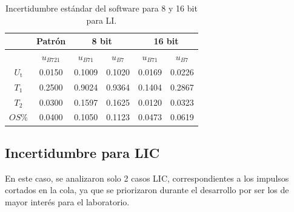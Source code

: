 \begin{table}[H]
    \centering
    \begin{tabular}{@{}cccccc@{}}
        \toprule
                              & \textbf{Patrón}     & \multicolumn{2}{c}{\textbf{8 bit}}     & \multicolumn{2}{c}{\textbf{16 bit}}    \\ \midrule
                              & \textbf{$u_{B721}$} & \textbf{$u_{B71}$} & \textbf{$u_{B7}$} & \textbf{$u_{B71}$} & \textbf{$u_{B7}$} \\ \midrule
        \textbf{$U_\text{t}$} & 0.0150              & 0.1009             & 0.1020            & 0.0169             & 0.0226            \\ \midrule
        \textbf{$T_1$}        & 0.2500              & 0.9024             & 0.9364            & 0.1404             & 0.2867            \\ \midrule
        \textbf{$T_2$}        & 0.0300              & 0.1597             & 0.1625            & 0.0120             & 0.0323            \\ \midrule
        \textbf{$OS\%$}       & 0.0400              & 0.1050             & 0.1123            & 0.0473             & 0.0619            \\ \bottomrule
        \end{tabular}
    \caption{Incertidumbre estándar del software para 8 y 16 bit para LI.}
    \label{tab:incertidumbre_software_li}
\end{table}

\subsection{Incertidumbre para LIC}
\label{subsec:incertidumbre_software_lic}

En este caso, se analizaron solo \num{2} casos LIC, correspondientes a los impulsos cortados en la cola, ya que se priorizaron durante el desarrollo por ser los de mayor interés para el laboratorio.

